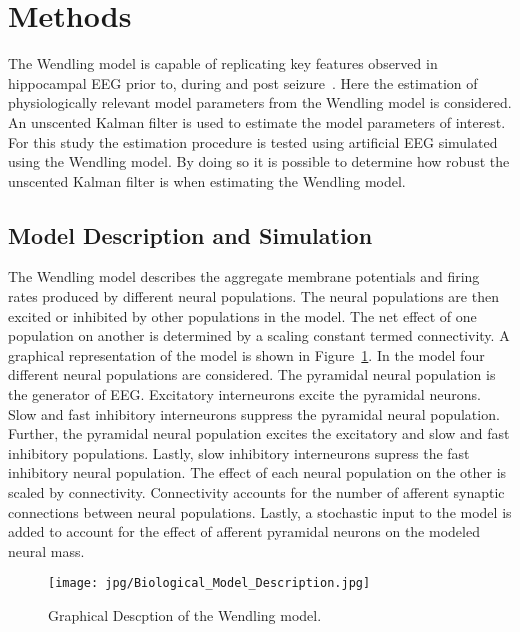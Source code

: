 \section{Methods}

The Wendling model is capable of replicating key features observed in hippocampal EEG prior to, during and post seizure~\citep{wendling2002epileptic}. Here the estimation of physiologically relevant model parameters from the Wendling model is considered. An unscented Kalman filter is used to estimate the model parameters of interest. For this study the estimation procedure is tested using artificial EEG simulated using the Wendling model. By doing so it is possible to determine how robust the unscented Kalman filter is when estimating the Wendling model.

\subsection{Model Description and Simulation}


The Wendling model describes the aggregate membrane potentials and firing rates produced by different neural populations. The neural populations are then excited or inhibited by other populations in the model. The net effect of one population on another is determined by a scaling constant termed connectivity. A graphical representation of the model is shown in Figure~\ref{fig: Biological}. In the model four different neural populations are considered. The pyramidal neural population is the generator of EEG. Excitatory interneurons excite the pyramidal neurons. Slow and fast inhibitory interneurons suppress the pyramidal neural population. Further, the pyramidal neural population excites the excitatory and slow and fast inhibitory populations. Lastly, slow inhibitory interneurons supress the fast inhibitory neural population. The effect of each neural population on the other is scaled by connectivity. Connectivity accounts for the number of afferent synaptic connections between neural populations.  Lastly, a stochastic input to the model is added to account for the effect of afferent pyramidal neurons on the modeled neural mass.
\begin{figure}  %
	\centering
		\texttt{[image: jpg/Biological\_Model\_Description.jpg]}
	\caption{Graphical Descption of the Wendling model.}
	\label{fig: Biological}
\end{figure}

